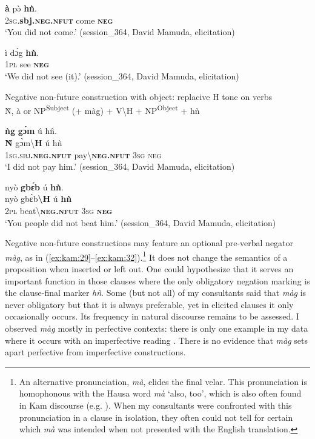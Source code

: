 \documentclass[output=paper,colorlinks,citecolor=brown]{langscibook}
\begin{document}
\ea\label{ex:kam:24} 
    \gll \textbf{à} pə̀ \textbf{hǹ}.\\
        \textsc{2sg}.\textbf{sbj.\textsc{neg}}\textbf{.\textsc{nfut}} come \textbf{\textsc{neg}}\\
    \glt ‘You did not come.’ (session\_364, David Mamuda, elicitation)
\z 

\ea\label{ex:kam:25} 
    \gll ì dɔ́g \textbf{hǹ}.\\
        \textsc{1pl} see \textbf{\textsc{neg}}\\
    \glt ‘We did not see (it).’ (session\_364, David Mamuda, elicitation)
\z 

\ea\label{ex:kam:26} 
    Negative non-future construction with object: replacive H tone on verbs\\
    \`{N}, à or NP\textsuperscript{Subject} (+ màg) + V{\textbackslash}H + NP\textsuperscript{Object} + hǹ
\z 

\ea\label{ex:kam:27} 
    \glll \textbf{ǹg} \textbf{gɔ́m} ú h\^{n}.\\
        \textbf{\`{N}} gɔ̀m{\textbackslash}\textbf{H} ú hǹ\\
        \textsc{1sg}.\textsc{sbj}\textbf{.\textsc{neg}}\textbf{.\textsc{nfut}} pay{\textbackslash}\textbf{\textsc{neg}}\textbf{.\textsc{nfut}} \textsc{3sg} \textsc{neg}\\
    \glt ‘I did not pay him.’ (session\_364, David Mamuda, elicitation)
\z 

\ea\label{ex:kam:28} 
    \glll nyò \textbf{gbɛ́b} ú \textbf{hǹ}.\\
        nyò gbɛ̀b\textbf{{\textbackslash}H} ú \textbf{hǹ}\\
        \textsc{2pl} beat{\textbackslash}\textbf{\textsc{neg}}\textbf{.\textsc{nfut}} \textsc{3sg} \textbf{\textsc{neg}}\\
    \glt ‘You people did not beat him.’ (session\_364, David Mamuda, elicitation)
\z 

Negative non-future constructions may feature an optional pre-verbal negator \textit{màg}, as in (\ref{ex:kam:29}--\ref{ex:kam:32}).\footnote{An alternative pronunciation, \textit{mà}, elides the final velar. This pronunciation is homophonous with the Hausa word \textit{mà} ‘also, too’, which is also often found in Kam discourse (e.g. ). When my consultants were confronted with this pronunciation in a clause in isolation, they often could not tell for certain which \textit{mà} was intended when not presented with the English translation.}  It does not change the semantics of a proposition when inserted or left out. One could hypothesize that it serves an important function in those clauses where the only obligatory negation marking is the clause-final marker \textit{hǹ}. Some (but not all) of my consultants said that \textit{màg} is never obligatory but that it is always preferable, yet in elicited clauses it only occasionally occurs. Its frequency in natural discourse remains to be assessed. I observed \textit{màg} mostly in perfective contexts: there is only one example in my data where it occurs with an imperfective reading . There is no evidence that \textit{màg} sets apart perfective from imperfective constructions.
\end{document}
